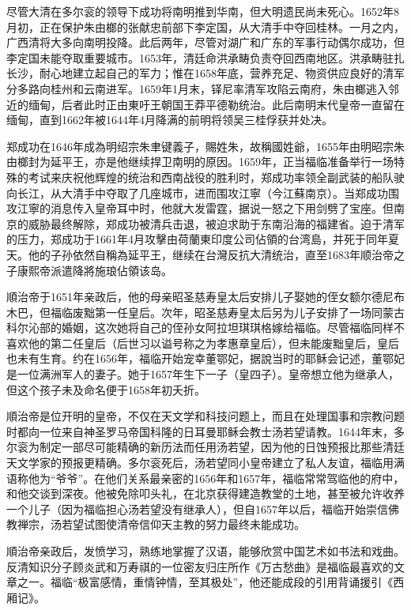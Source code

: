 尽管大清在多尔衮的领导下成功将南明推到华南，但大明遗民尚未死心。1652年8月初，正在保护朱由榔的张献忠前部下李定国，从大清手中夺回桂林。一月之内，广西清将大多向南明投降。此后两年，尽管对湖广和广东的军事行动偶尔成功，但李定国未能夺取重要城市。1653年，清廷命洪承畴负责夺回西南地区。洪承畴驻扎长沙，耐心地建立起自己的军力；惟在1658年底，营养充足、物资供应良好的清军分多路向桂州和云南进军。1659年1月末，铎尼率清军攻陷云南府，朱由榔逃入邻近的缅甸，后者此时正由東吁王朝国王莽平德勒统治。此后南明末代皇帝一直留在缅甸，直到1662年被1644年4月降满的前明将领吴三桂俘获并处决。

郑成功在1646年成為明绍宗朱聿键義子，賜姓朱，故稱國姓爺，1655年由明昭宗朱由榔封为延平王，亦是他继续捍卫南明的原因。1659年，正当福临准备举行一场特殊的考试来庆祝他辉煌的统治和西南战役的胜利时，郑成功率领全副武装的船队驶向长江，从大清手中夺取了几座城市，进而围攻江寧（今江蘇南京）。当郑成功围攻江寧的消息传入皇帝耳中时，他就大发雷霆，据说一怒之下用剑劈了宝座。但南京的威胁最终解除，郑成功被清兵击退，被迫求助于东南沿海的福建省。迫于清军的压力，郑成功于1661年4月攻擊由荷蘭東印度公司佔領的台湾島，并死于同年夏天。他的子孙依然自稱為延平王，继续在台灣反抗大清统治，直至1683年顺治帝之子康熙帝派遣降將施琅佔領该岛。

順治帝于1651年亲政后，他的母亲昭圣慈寿皇太后安排儿子娶她的侄女额尔德尼布木巴，但福临废黜第一任皇后。次年，昭圣慈寿皇太后另为儿子安排了一场同蒙古科尔沁部的婚姻，这次她将自己的侄孙女阿拉坦琪琪格嫁给福临。尽管福临同样不喜欢他的第二任皇后（后世习以谥号称之为孝惠章皇后），但未能废黜皇后，皇后也未有生育。约在1656年，福临开始宠幸董鄂妃，据說当时的耶稣会记述，董鄂妃是一位满洲军人的妻子。她于1657年生下一子（皇四子）。皇帝想立他为继承人，但这个孩子未及命名便于1658年初夭折。

順治帝是位开明的皇帝，不仅在天文学和科技问题上，而且在处理国事和宗教问题时都向一位来自神圣罗马帝国科隆的日耳曼耶稣会教士汤若望请教。1644年末，多尔衮为制定一部尽可能精确的新历法而任用汤若望，因为他的日蚀预报比那些清廷天文学家的预报更精确。多尔衮死后，汤若望同小皇帝建立了私人友谊，福临用满语称他为“爷爷”。在他们关系最亲密的1656年和1657年，福临常常驾临他的府中，和他交谈到深夜。他被免除叩头礼，在北京获得建造教堂的土地，甚至被允许收养一个儿子（因为福临担心汤若望没有继承人），但自1657年以后，福临开始崇信佛教禅宗，汤若望试图使清帝信仰天主教的努力最终未能成功。

順治帝亲政后，发愤学习，熟练地掌握了汉语，能够欣赏中国艺术如书法和戏曲。反清知识分子顾炎武和万寿祺的一位密友归庄所作《万古愁曲》是福临最喜欢的文章之一。福临“极富感情，重情钟情，至其极处”，他还能成段的引用背诵援引《西厢记》。

